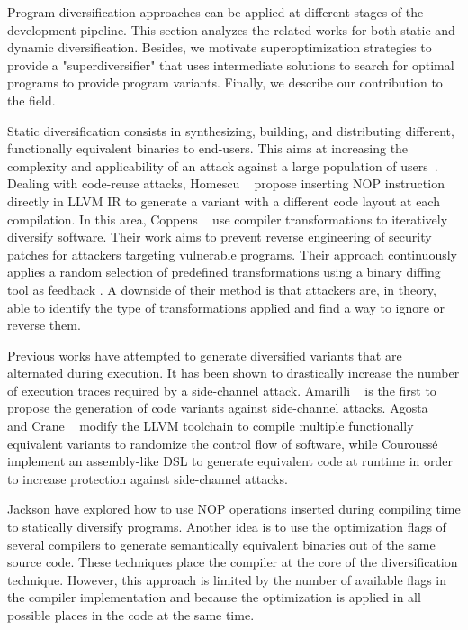 
Program diversification approaches can be applied at different stages of the development pipeline. This section analyzes the related works for both static and dynamic diversification. Besides, we motivate superoptimization strategies to provide a "superdiversifier" that uses intermediate solutions to search for optimal programs to provide program variants. Finally, we describe our contribution to the field.


Static diversification consists in synthesizing, building, and distributing different, functionally equivalent binaries to end-users. This aims at increasing the complexity and applicability of an attack against a large population of users~\cite{cohen1993operating}. 
Dealing with code-reuse attacks, Homescu \etal~\cite{homescu2013profile} propose inserting NOP instruction directly in LLVM IR to generate a variant with a different code layout at each compilation. 
In this area, Coppens \etal~\cite{coppens2013feedback} use compiler transformations to iteratively diversify software.
Their work aims to prevent reverse engineering of security patches for attackers targeting vulnerable programs.
Their approach continuously applies a random selection of predefined transformations using a binary diffing tool as feedback \citationneeded.
A downside of their method is that attackers are, in theory, able to identify the type of transformations applied and find a way to ignore or reverse them.

Previous works have attempted to generate diversified variants that are alternated during execution.
It has been shown to drastically increase the number of execution traces required by a side-channel attack.
Amarilli \etal~\cite{amarilli2011can} is the first to propose the generation of code variants against side-channel attacks.
Agosta \etal~\cite{agosta2015meet} and Crane \etal~\cite{crane2015thwarting}
modify the LLVM toolchain to compile multiple functionally equivalent variants to randomize the control flow of software,
while Courouss{\'e} \etal~\cite{courousse2016runtime} implement an assembly-like DSL to generate equivalent code at runtime in order to increase protection against side-channel attacks. 


Jackson \etal \cite{jackson} have explored how to use NOP operations inserted during compiling time to statically diversify programs. Another idea  is to use the optimization flags of several compilers to generate semantically equivalent binaries out of the same source code. These techniques place the compiler at the core of the diversification technique. However, this approach is limited by the number of available flags in the compiler implementation and because the optimization is applied in all possible places in the code at the same time.


